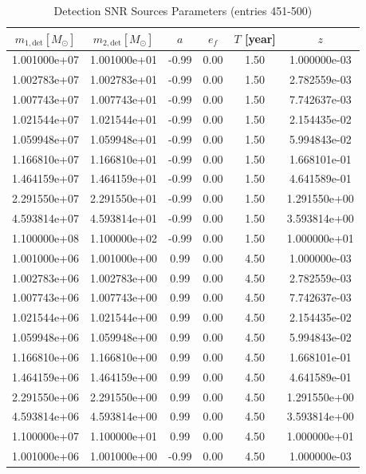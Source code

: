 \documentclass{article}
\begin{document}
\clearpage

\begin{table}[htbp]
\centering
\caption{Detection SNR Sources Parameters (entries 451-500)}
\label{tab:snr_sources_10}
\begin{tabular}{cccccc}
\hline
$m_{1,\mathrm{det}} [M_\odot]$ & $m_{2,\mathrm{det}} [M_\odot]$ & $a$ & $e_f$ & $T$ [year] & $z$ \\
\hline
1.001000e+07 & 1.001000e+01 & -0.99 & 0.00 & 1.50 & 1.000000e-03 \\
1.002783e+07 & 1.002783e+01 & -0.99 & 0.00 & 1.50 & 2.782559e-03 \\
1.007743e+07 & 1.007743e+01 & -0.99 & 0.00 & 1.50 & 7.742637e-03 \\
1.021544e+07 & 1.021544e+01 & -0.99 & 0.00 & 1.50 & 2.154435e-02 \\
1.059948e+07 & 1.059948e+01 & -0.99 & 0.00 & 1.50 & 5.994843e-02 \\
1.166810e+07 & 1.166810e+01 & -0.99 & 0.00 & 1.50 & 1.668101e-01 \\
1.464159e+07 & 1.464159e+01 & -0.99 & 0.00 & 1.50 & 4.641589e-01 \\
2.291550e+07 & 2.291550e+01 & -0.99 & 0.00 & 1.50 & 1.291550e+00 \\
4.593814e+07 & 4.593814e+01 & -0.99 & 0.00 & 1.50 & 3.593814e+00 \\
1.100000e+08 & 1.100000e+02 & -0.99 & 0.00 & 1.50 & 1.000000e+01 \\
1.001000e+06 & 1.001000e+00 & 0.99 & 0.00 & 4.50 & 1.000000e-03 \\
1.002783e+06 & 1.002783e+00 & 0.99 & 0.00 & 4.50 & 2.782559e-03 \\
1.007743e+06 & 1.007743e+00 & 0.99 & 0.00 & 4.50 & 7.742637e-03 \\
1.021544e+06 & 1.021544e+00 & 0.99 & 0.00 & 4.50 & 2.154435e-02 \\
1.059948e+06 & 1.059948e+00 & 0.99 & 0.00 & 4.50 & 5.994843e-02 \\
1.166810e+06 & 1.166810e+00 & 0.99 & 0.00 & 4.50 & 1.668101e-01 \\
1.464159e+06 & 1.464159e+00 & 0.99 & 0.00 & 4.50 & 4.641589e-01 \\
2.291550e+06 & 2.291550e+00 & 0.99 & 0.00 & 4.50 & 1.291550e+00 \\
4.593814e+06 & 4.593814e+00 & 0.99 & 0.00 & 4.50 & 3.593814e+00 \\
1.100000e+07 & 1.100000e+01 & 0.99 & 0.00 & 4.50 & 1.000000e+01 \\
1.001000e+06 & 1.001000e+00 & -0.99 & 0.00 & 4.50 & 1.000000e-03 \\

\end{tabular}
\end{table}
\end{document}
